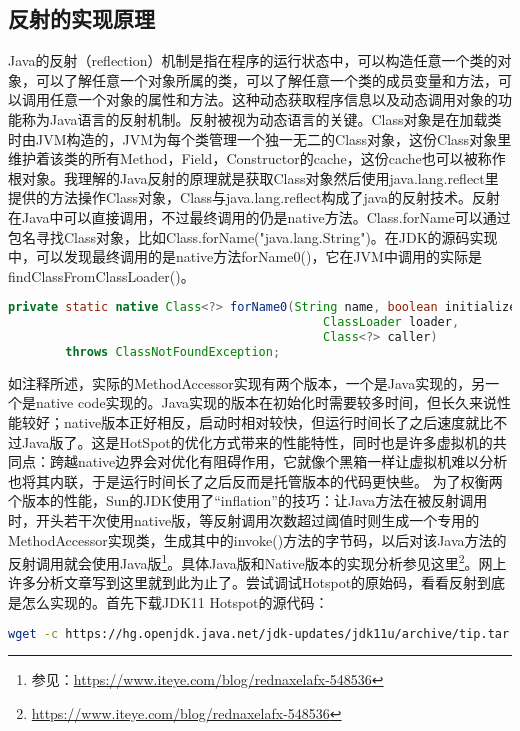 \documentclass[../../../interview-questions.tex]{subfiles}
\begin{document}
\subsection{反射的实现原理}

Java的反射（reflection）机制是指在程序的运行状态中，可以构造任意一个类的对象，可以了解任意一个对象所属的类，可以了解任意一个类的成员变量和方法，可以调用任意一个对象的属性和方法。这种动态获取程序信息以及动态调用对象的功能称为Java语言的反射机制。反射被视为动态语言的关键。Class对象是在加载类时由JVM构造的，JVM为每个类管理一个独一无二的Class对象，这份Class对象里维护着该类的所有Method，Field，Constructor的cache，这份cache也可以被称作根对象。我理解的Java反射的原理就是获取Class对象然后使用java.lang.reflect里提供的方法操作Class对象，Class与java.lang.reflect构成了java的反射技术。反射在Java中可以直接调用，不过最终调用的仍是native方法。Class.forName可以通过包名寻找Class对象，比如Class.forName("java.lang.String")。在JDK的源码实现中，可以发现最终调用的是native方法forName0()，它在JVM中调用的实际是findClassFromClassLoader()。

\begin{lstlisting}[language=Java]
private static native Class<?> forName0(String name, boolean initialize,
                                            ClassLoader loader,
                                            Class<?> caller)
        throws ClassNotFoundException;
\end{lstlisting}

如注释所述，实际的MethodAccessor实现有两个版本，一个是Java实现的，另一个是native code实现的。Java实现的版本在初始化时需要较多时间，但长久来说性能较好；native版本正好相反，启动时相对较快，但运行时间长了之后速度就比不过Java版了。这是HotSpot的优化方式带来的性能特性，同时也是许多虚拟机的共同点：跨越native边界会对优化有阻碍作用，它就像个黑箱一样让虚拟机难以分析也将其内联，于是运行时间长了之后反而是托管版本的代码更快些。
为了权衡两个版本的性能，Sun的JDK使用了“inflation”的技巧：让Java方法在被反射调用时，开头若干次使用native版，等反射调用次数超过阈值时则生成一个专用的MethodAccessor实现类，生成其中的invoke()方法的字节码，以后对该Java方法的反射调用就会使用Java版\footnote{参见：\url{https://www.iteye.com/blog/rednaxelafx-548536}}。具体Java版和Native版本的实现分析参见这里\footnote{\url{https://www.iteye.com/blog/rednaxelafx-548536}}。网上许多分析文章写到这里就到此为止了。尝试调试Hotspot的原始码，看看反射到底是怎么实现的。首先下载JDK11 Hotspot的源代码：

\begin{lstlisting}[language=Bash]
wget -c https://hg.openjdk.java.net/jdk-updates/jdk11u/archive/tip.tar.gz    
\end{lstlisting}
\end{document}

